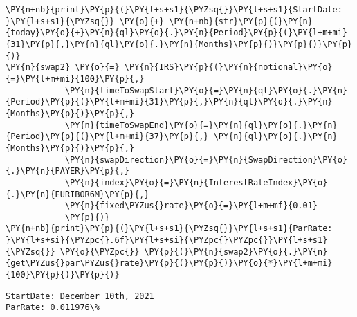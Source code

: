     \begin{tcolorbox}[breakable, size=fbox, boxrule=1pt, pad at break*=1mm,colback=cellbackground, colframe=cellborder]
\begin{Verbatim}[commandchars=\\\{\}]
\PY{n+nb}{print}\PY{p}{(}\PY{l+s+s1}{\PYZsq{}}\PY{l+s+s1}{StartDate: }\PY{l+s+s1}{\PYZsq{}} \PY{o}{+} \PY{n+nb}{str}\PY{p}{(}\PY{n}{today}\PY{o}{+}\PY{n}{ql}\PY{o}{.}\PY{n}{Period}\PY{p}{(}\PY{l+m+mi}{31}\PY{p}{,}\PY{n}{ql}\PY{o}{.}\PY{n}{Months}\PY{p}{)}\PY{p}{)}\PY{p}{)}
\PY{n}{swap2} \PY{o}{=} \PY{n}{IRS}\PY{p}{(}\PY{n}{notional}\PY{o}{=}\PY{l+m+mi}{100}\PY{p}{,}
            \PY{n}{timeToSwapStart}\PY{o}{=}\PY{n}{ql}\PY{o}{.}\PY{n}{Period}\PY{p}{(}\PY{l+m+mi}{31}\PY{p}{,}\PY{n}{ql}\PY{o}{.}\PY{n}{Months}\PY{p}{)}\PY{p}{,}
            \PY{n}{timeToSwapEnd}\PY{o}{=}\PY{n}{ql}\PY{o}{.}\PY{n}{Period}\PY{p}{(}\PY{l+m+mi}{37}\PY{p}{,} \PY{n}{ql}\PY{o}{.}\PY{n}{Months}\PY{p}{)}\PY{p}{,}
            \PY{n}{swapDirection}\PY{o}{=}\PY{n}{SwapDirection}\PY{o}{.}\PY{n}{PAYER}\PY{p}{,}
            \PY{n}{index}\PY{o}{=}\PY{n}{InterestRateIndex}\PY{o}{.}\PY{n}{EURIBOR6M}\PY{p}{,}
            \PY{n}{fixed\PYZus{}rate}\PY{o}{=}\PY{l+m+mf}{0.01}
            \PY{p}{)}
\PY{n+nb}{print}\PY{p}{(}\PY{l+s+s1}{\PYZsq{}}\PY{l+s+s1}{ParRate: }\PY{l+s+si}{\PYZpc{}.6f}\PY{l+s+si}{\PYZpc{}\PYZpc{}}\PY{l+s+s1}{\PYZsq{}} \PY{o}{\PYZpc{}} \PY{p}{(}\PY{n}{swap2}\PY{o}{.}\PY{n}{get\PYZus{}par\PYZus{}rate}\PY{p}{(}\PY{p}{)}\PY{o}{*}\PY{l+m+mi}{100}\PY{p}{)}\PY{p}{)}
\end{Verbatim}
\end{tcolorbox}

    \begin{Verbatim}[commandchars=\\\{\}]
StartDate: December 10th, 2021
ParRate: 0.011976\%
    \end{Verbatim}


